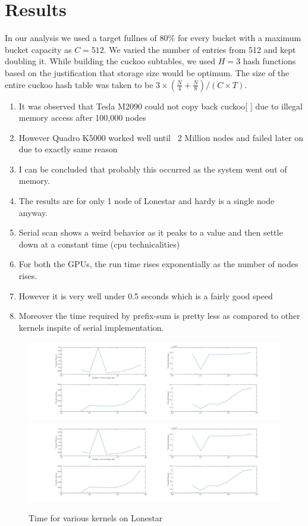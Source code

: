 \documentclass[a4paper,12pt]{report}
\begin{document}
\section{Results}
In our analysis we used a target fullnes of $80 \%$ for every bucket with a maximum bucket capacity as $C=512$.
 We varied the number of entries from 512 and kept doubling it. While building the cuckoo subtables, we used  $H=3$ hash 
functions based on the justification that storage size would be optimum. The size of the entire cuckoo hash table was
 taken to be $3 \times (\frac{N}{4} + \frac{N}{8})/(C \times T)$. \\
\begin{enumerate}
\item It was observed that Tesla M2090 could not copy back cuckoo[ ] due to illegal memory access after 100,000 nodes
\item However Quadro K5000 worked well until ~2 Million nodes and failed later on due to exactly same reason
\item I can be concluded that probably this occurred as the system went out of memory.
\item The results are for only 1 node of Lonestar and hardy is a single node anyway.
\item Serial scan shows a weird behavior as it peaks to a value and then settle down at a constant time  (cpu technicalities)
\item For both the GPUs, the run time rises exponentially as the number of nodes rises.
\item However it is very well under 0.5 seconds which is a fairly good speed
\item Moreover the time required by prefix-sum is pretty less as compared to other kernels inspite of serial implementation.
\end{enumerate}
\begin{figure}
\centering
\includegraphics[scale=0.6,trim = 10cm 0 40cm 0]{allbuildtimes.jpg}\\
\includegraphics[scale=0.6,trim = 40cm 0 10cm 0 ]{allbuildtimes.jpg}
\label{all_lonestar}
\caption{Time for various kernels on Lonestar}
\end{figure}
\end{document}

